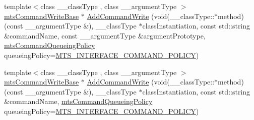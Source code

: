 {\bf }\par
\begin{DoxyCompactItemize}
\item 
{\footnotesize template$<$class \-\_\-\-\_\-class\-Type , class \-\_\-\-\_\-argument\-Type $>$ }\\\hyperlink{classmts_command_write_base}{mts\-Command\-Write\-Base} $\ast$ \hyperlink{classmts_interface_provided_a8c4b4bafb7830c83688d24ee847c0592}{Add\-Command\-Write} (void(\-\_\-\-\_\-class\-Type\-::$\ast$method)(const \-\_\-\-\_\-argument\-Type \&), \-\_\-\-\_\-class\-Type $\ast$class\-Instantiation, const std\-::string \&command\-Name, const \-\_\-\-\_\-argument\-Type \&argument\-Prototype, \hyperlink{mts_forward_declarations_8h_aa2ac24035e136fa1689dcc2854c63fc7}{mts\-Command\-Queueing\-Policy} queueing\-Policy=\hyperlink{mts_forward_declarations_8h_aa2ac24035e136fa1689dcc2854c63fc7a4f444b4120a5e2efd084e2e5a214f5c8}{M\-T\-S\-\_\-\-I\-N\-T\-E\-R\-F\-A\-C\-E\-\_\-\-C\-O\-M\-M\-A\-N\-D\-\_\-\-P\-O\-L\-I\-C\-Y})
\item 
{\footnotesize template$<$class \-\_\-\-\_\-class\-Type , class \-\_\-\-\_\-argument\-Type $>$ }\\\hyperlink{classmts_command_write_base}{mts\-Command\-Write\-Base} $\ast$ \hyperlink{classmts_interface_provided_a9f662ac9d54dc015862bb2d325081518}{Add\-Command\-Write} (void(\-\_\-\-\_\-class\-Type\-::$\ast$method)(const \-\_\-\-\_\-argument\-Type \&), \-\_\-\-\_\-class\-Type $\ast$class\-Instantiation, const std\-::string \&command\-Name, \hyperlink{mts_forward_declarations_8h_aa2ac24035e136fa1689dcc2854c63fc7}{mts\-Command\-Queueing\-Policy} queueing\-Policy=\hyperlink{mts_forward_declarations_8h_aa2ac24035e136fa1689dcc2854c63fc7a4f444b4120a5e2efd084e2e5a214f5c8}{M\-T\-S\-\_\-\-I\-N\-T\-E\-R\-F\-A\-C\-E\-\_\-\-C\-O\-M\-M\-A\-N\-D\-\_\-\-P\-O\-L\-I\-C\-Y})
\end{DoxyCompactItemize}

